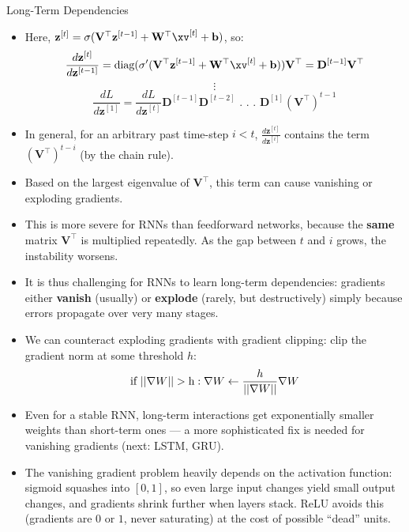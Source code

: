 \begin{vbframe}{Long-Term Dependencies}
  \begin{itemize}
    \item Here, $\mathbf{z}^{[t]} = \sigma(\mathbf{V}^\top \mathbf{z}^{[t-1]} + \mathbf{W}^\top \xv^{[t]} + \mathbf{b})$, so:
    $$ \frac{d \mathbf{z}^{[t]}}{d\mathbf{z}^{[t-1]}} = \text{diag}(\sigma' (\mathbf{V}^\top \mathbf{z}^{[t-1]} + \mathbf{W}^\top \xv^{[t]} + \mathbf{b})) \mathbf{V}^\top = \mathbf{D}^{[t-1]} \mathbf{V}^\top $$
    $$ \vdots $$
    $$ \frac{d L}{d \mathbf{z}^{[1]}} = \frac{d L}{d \mathbf{z}^{[t]}} \mathbf{D}^{[t-1]} \mathbf{D}^{[t-2]}   \text{ . . . } \mathbf{D}^{[1]} (\mathbf{V}^\top)^{t-1}$$
    \item In general, for an arbitrary past time-step $i<t$, $\frac{d\mathbf{z}^{[t]}}{d\mathbf{z}^{[i]}}$ contains the term $(\mathbf{V}^\top)^{t-i}$ (by the chain rule).
    \item Based on the largest eigenvalue of $\mathbf{V}^\top$, this term can cause vanishing or exploding gradients.
    \item This is more severe for RNNs than feedforward networks, because the \textbf{same} matrix $\mathbf{V}^\top$ is multiplied repeatedly. As the gap between $t$ and $i$ grows, the instability worsens.
    \item It is thus challenging for RNNs to learn long-term dependencies: gradients either \textbf{vanish} (usually) or \textbf{explode} (rarely, but destructively) simply because errors propagate over very many stages.
  \end{itemize}
  \begin{itemize}
    \item We can counteract exploding gradients with gradient clipping: clip the gradient norm at some threshold $h$: $$\text{if  } ||\nabla W|| > \text h: \nabla W \leftarrow \frac{h}{||\nabla W||} \nabla W $$
  \end{itemize}
  \begin{itemize}
    \item Even for a stable RNN, long-term interactions get exponentially smaller weights than short-term ones --- a more sophisticated fix is needed for vanishing gradients (next: LSTM, GRU).
    \item The vanishing gradient problem heavily depends on the activation function: sigmoid squashes into $[0,1]$, so even large input changes yield small output changes, and gradients shrink further when layers stack. ReLU avoids this (gradients are $0$ or $1$, never saturating) at the cost of possible \enquote{dead} units.
  \end{itemize}
\end{vbframe}


